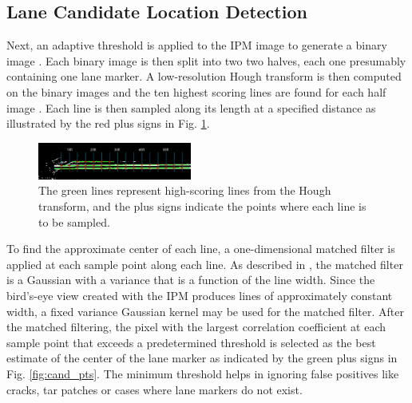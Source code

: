\documentclass{article}
\begin{document}
\subsection{Lane Candidate Location Detection}
Next, an adaptive threshold is applied to the IPM image to generate a binary image \cite{borkar_layered_2009}. Each binary image is then split into two two halves, each one presumably containing one lane marker.
A low-resolution Hough transform is then computed on the binary images and the ten highest scoring lines are found for each half image \cite{borkar_layered_2009}. Each line is then sampled along its length at a specified distance as illustrated by the red plus signs in Fig. \ref{fig:sampling_points}.
\begin{figure}[htb]
  \centering
  \includegraphics[width=0.45\textwidth]{IMG/cand_lane_points.png}
  \caption{The green lines represent high-scoring lines from the Hough transform, and the plus signs indicate the points where each line is to be sampled.}
  \label{fig:sampling_points}
\end{figure}
To find the approximate center of each line, a one-dimensional matched filter is applied at each sample point along each line.
As described in \cite{borkar_layered_2009}, the matched filter is a Gaussian with a variance that is a function of the line width.
Since the bird's-eye view created with the IPM produces lines of approximately constant width, a fixed variance Gaussian kernel may be used for the matched filter.
After the matched filtering, the pixel with the largest correlation coefficient at each sample point that exceeds a predetermined threshold is selected as the best estimate of the center of the lane marker as indicated by the green plus signs in Fig. \ref{fig:cand_pts}. The minimum threshold helps in ignoring false positives like cracks, tar patches or cases where lane markers do not exist.
\end{document}
